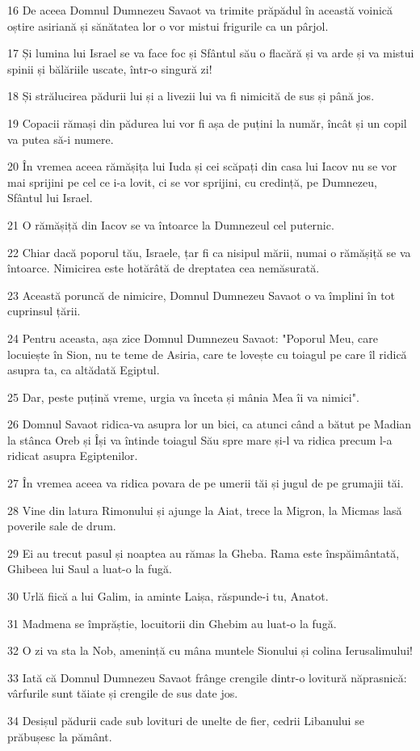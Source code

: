 \par 16 De aceea Domnul Dumnezeu Savaot va trimite prăpădul în această voinică oștire asiriană și sănătatea lor o vor mistui frigurile ca un pârjol.
\par 17 Și lumina lui Israel se va face foc și Sfântul său o flacără și va arde și va mistui spinii și bălăriile uscate, într-o singură zi!
\par 18 Și strălucirea pădurii lui și a livezii lui va fi nimicită de sus și până jos.
\par 19 Copacii rămași din pădurea lui vor fi așa de puțini la număr, încât și un copil va putea să-i numere.
\par 20 În vremea aceea rămășița lui Iuda și cei scăpați din casa lui Iacov nu se vor mai sprijini pe cel ce i-a lovit, ci se vor sprijini, cu credință, pe Dumnezeu, Sfântul lui Israel.
\par 21 O rămășiță din Iacov se va întoarce la Dumnezeul cel puternic.
\par 22 Chiar dacă poporul tău, Israele, țar fi ca nisipul mării, numai o rămășiță se va întoarce. Nimicirea este hotărâtă de dreptatea cea nemăsurată.
\par 23 Această poruncă de nimicire, Domnul Dumnezeu Savaot o va împlini în tot cuprinsul țării.
\par 24 Pentru aceasta, așa zice Domnul Dumnezeu Savaot: "Poporul Meu, care locuiește în Sion, nu te teme de Asiria, care te lovește cu toiagul pe care îl ridică asupra ta, ca altădată Egiptul.
\par 25 Dar, peste puțină vreme, urgia va înceta și mânia Mea îi va nimici".
\par 26 Domnul Savaot ridica-va asupra lor un bici, ca atunci când a bătut pe Madian la stânca Oreb și Își va întinde toiagul Său spre mare și-l va ridica precum l-a ridicat asupra Egiptenilor.
\par 27 În vremea aceea va ridica povara de pe umerii tăi și jugul de pe grumajii tăi.
\par 28 Vine din latura Rimonului și ajunge la Aiat, trece la Migron, la Micmas lasă poverile sale de drum.
\par 29 Ei au trecut pasul și noaptea au rămas la Gheba. Rama este înspăimântată, Ghibeea lui Saul a luat-o la fugă.
\par 30 Urlă fiică a lui Galim, ia aminte Laișa, răspunde-i tu, Anatot.
\par 31 Madmena se împrăștie, locuitorii din Ghebim au luat-o la fugă.
\par 32 O zi va sta la Nob, amenință cu mâna muntele Sionului și colina Ierusalimului!
\par 33 Iată că Domnul Dumnezeu Savaot frânge crengile dintr-o lovitură năprasnică: vârfurile sunt tăiate și crengile de sus date jos.
\par 34 Desișul pădurii cade sub lovituri de unelte de fier, cedrii Libanului se prăbușesc la pământ.

